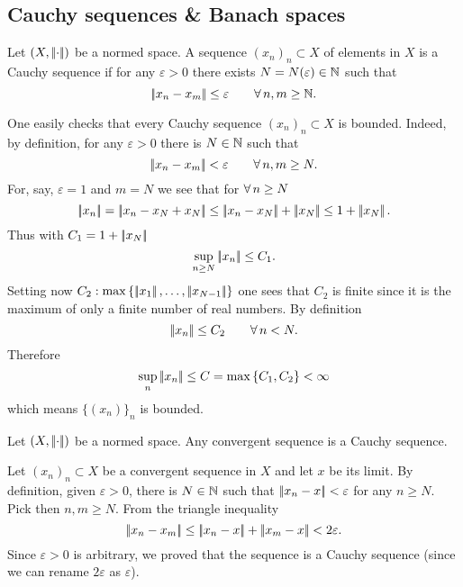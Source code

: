 \documentclass{article}
\begin{document}
\subsection{Cauchy sequences \& Banach spaces}
\begin{definition}
	Let $(X,\left|\negthinspace\left|\cdot\right|\negthinspace\right|)$ be a normed space. A sequence ${(x_{n})}_{n}\subset X$ of elements in $X$ is a Cauchy sequence if for any $\varepsilon>0$ there exists $N=N(\varepsilon)\in\mathbb{N}$ such that
	\begin{equation*}
		\left|\negthinspace\left|x_{n}-x_{m}\right|\negthinspace\right|\leq\varepsilon\qquad\forall\, n,m\geq\mathbb{N}.
	\end{equation*}
\end{definition}
One easily checks that every Cauchy sequence ${(x_{n})}_{n}\subset X$ is bounded. Indeed, by definition, for any $\varepsilon>0$ there is $N\in\mathbb{N}$ such that
\begin{equation*}
	\left|\negthinspace\left|x_{n}-x_{m}\right|\negthinspace\right|<\varepsilon\qquad\forall\, n,m\geq N.
\end{equation*} 
For, say, $\varepsilon=1$ and $m=N$ we see that for $\forall\, n\geq N$
\begin{equation*}
	\norm{x_{n}}=\norm{x_{n}-x_{N}+x_{N}}\leq\norm{x_{n}-x_{N}}+\norm{x_{N}}\leq 1+\norm{x_{N}}.
\end{equation*}
Thus with $C_{1}=1+\left|\negthinspace\left|x_{N}\right|\negthinspace\right|$
\begin{equation*}
	\sup_{n\geq N}\left|\negthinspace\left|x_{n}\right|\negthinspace\right|\leq C_{1}.
\end{equation*}
Setting now $C_{2}:\max\left\{\left|\negthinspace\left|x_{1}\right|\negthinspace\right|,\ldots,\left|\negthinspace\left|x_{N-1}\right|\negthinspace\right|\right\}$ one sees that $C_{2}$ is finite since it is the maximum of only a finite number of real numbers. By definition
\begin{equation*}
	\left|\negthinspace\left|x_{n}\right|\negthinspace\right|\leq C_{2}\qquad\forall\, n<N.
\end{equation*}
Therefore
\begin{equation*}
	\sup_{n}\left|\negthinspace\left|x_{n}\right|\negthinspace\right|\leq C=\max\left\{C_1,C_2\right\}<\infty
\end{equation*}
which means $\{(x_{n})\}_{n}$ is bounded.
\begin{lemma}
	Let $(X,\left|\negthinspace\left|\cdot\right|\negthinspace\right|)$ be a normed space. Any convergent sequence is a Cauchy sequence.
\end{lemma}
\begin{fancyproof}
	Let ${(x_{n})}_{n}\subset X$ be a convergent sequence in $X$ and let $x$ be its limit. By definition, given $\varepsilon>0$, there is $N\in\mathbb{N}$ such that $\left|\negthinspace\left|x_{n}-x\right|\negthinspace\right|<\varepsilon$ for any $n\geq N$. Pick then $n,m\geq N$. From the triangle inequality
	\begin{equation*}
		\left|\negthinspace\left|x_{n}-x_{m}\right|\negthinspace\right|\leq\left|\negthinspace\left|x_{n}-x\right|\negthinspace\right|+\left|\negthinspace\left|x_{m}-x\right|\negthinspace\right|<2\varepsilon.
	\end{equation*}
	Since $\varepsilon>0$ is arbitrary, we proved that the sequence is a Cauchy sequence (since we can rename $2\varepsilon$ as $\varepsilon$).
\end{fancyproof}
\end{document}
